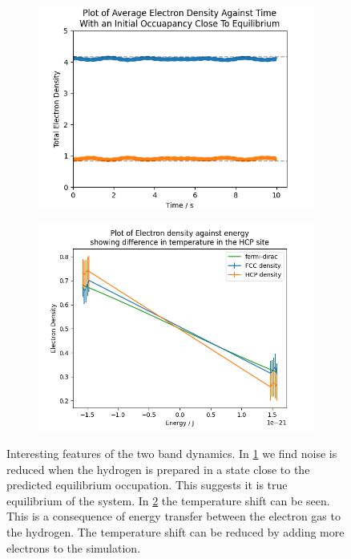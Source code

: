 \begin{figure}[htbp]
    \centering
    \begin{subfigure}{0.45\linewidth}
        \includegraphics[width=0.9\linewidth]{Figures/Simulation/Two Small Bands Probability Clsoe To Equilibrium.png}
        \label{fig:two band close to equilibrium}
    \end{subfigure}
    \hfill
    \begin{subfigure}{0.45\linewidth}
        \includegraphics[width=0.9\linewidth]{Figures/Simulation/two band electron distribution.png}
        \label{fig:two band temperature shift}
    \end{subfigure}
    \caption{
        Interesting features of the two
        band dynamics.
        In \cref{fig:two band close to equilibrium}
        we find noise is reduced when the
        hydrogen is prepared in a state
        close to the predicted equilibrium
        occupation. This suggests it is
        true equilibrium of the
        system.
        In \cref{fig:two band temperature shift}
        the temperature shift can be seen.
        This is a consequence of energy transfer
        between the electron gas to the
        hydrogen. The temperature
        shift can be reduced by adding
        more electrons to the
        simulation.
    }\label{fig:final notes two band}
\end{figure}